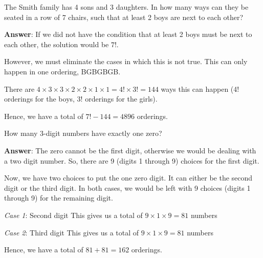 \documentclass[12pt]{article}
\newenvironment{exercise}[2][Exercise]{\begin{trivlist}
\item[\hskip \labelsep {\bfseries #1}\hskip \labelsep {\bfseries #2.}]}{\end{trivlist}}
\begin{document}
\begin{exercise}{1.3}
The Smith family has 4 sons and 3 daughters. In how many ways can they be seated in a row of 7 chairs, such that at least 2 boys are next to each other?

\textbf{Answer}: If we did not have the condition that at least 2 boys must be next to each other, the solution would be $7!$. 

However, we must eliminate the cases in which this is not true. This can only happen in one ordering, BGBGBGB. 

There are $4 \times 3 \times 3 \times 2 \times 2 \times 1 \times 1 = 4! \times 3! = 144$ ways this can happen (4! orderings for the boys, 3! orderings for the girls).

Hence, we have a total of $7! - 144 = \boxed{4896}$ orderings.

\end{exercise}



\begin{exercise}{1.4}
How many 3-digit numbers have exactly one zero?

\textbf{Answer}: The zero cannot be the first digit, otherwise we would be dealing with a two digit number. So, there are 9 (digits 1 through 9) choices for the first digit.

Now, we have two choices to put the one zero digit. It can either be the second digit or the third digit. In both cases, we would be left with 9 choices (digits 1 through 9) for the remaining digit.

\textit{Case 1}: Second digit
This gives us a total of $9 \times 1 \times 9 = 81$ numbers

\textit{Case 2}: Third digit
This gives us a total of $9 \times 1 \times 9 = 81$ numbers

Hence, we have a total of $81 + 81 = \boxed{162}$ orderings.

\end{exercise}
\end{document}
